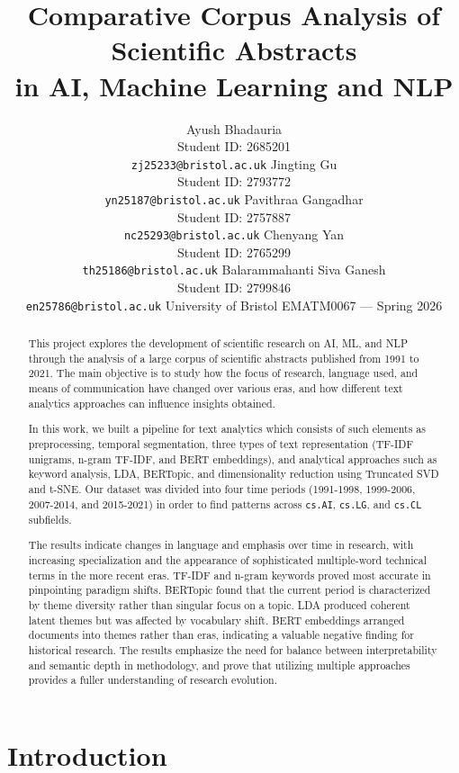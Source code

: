 \documentclass{article}
\title{Comparative Corpus Analysis of Scientific Abstracts\\
       in AI, Machine Learning and NLP}
\author{
  Ayush Bhadauria \\
  Student ID: 2685201 \\
  \texttt{zj25233@bristol.ac.uk}
  \And
  Jingting Gu \\
  Student ID: 2793772 \\
  \texttt{yn25187@bristol.ac.uk}
  \And
  Pavithraa Gangadhar \\
  Student ID: 2757887 \\
  \texttt{nc25293@bristol.ac.uk}
  \AND
  Chenyang Yan \\
  Student ID: 2765299 \\
  \texttt{th25186@bristol.ac.uk}
  \And
  Balarammahanti Siva Ganesh \\
  Student ID: 2799846 \\
  \texttt{en25786@bristol.ac.uk}
  \AND
  University of Bristol \quad EMATM0067 --- Spring 2026
}
\begin{document}
\maketitle

\begin{abstract}
This project explores the development of scientific
research on AI, ML, and NLP through the analysis of
a large corpus of scientific abstracts published from
1991 to 2021. The main objective is to study how the
focus of research, language used, and means of communication
have changed over various eras, and how different text
analytics approaches can influence insights obtained.

In this work, we built a pipeline for text analytics
which consists of such elements as preprocessing, temporal
segmentation, three types of text representation (TF-IDF
unigrams, n-gram TF-IDF, and BERT embeddings), and analytical
approaches such as keyword analysis, LDA, BERTopic, and
dimensionality reduction using Truncated SVD and t-SNE.
Our dataset was divided into four time periods (1991-1998,
1999-2006, 2007-2014, and 2015-2021) in order to find
patterns across \texttt{cs.AI}, \texttt{cs.LG},
and \texttt{cs.CL} subfields.

The results indicate changes in language and emphasis
over time in research, with increasing specialization and
the appearance of sophisticated multiple-word technical
terms in the more recent eras. TF-IDF and n-gram keywords
proved most accurate in pinpointing paradigm shifts. BERTopic
found that the current period is characterized by
theme diversity rather than singular focus on a topic.
LDA produced coherent latent themes but was affected by
vocabulary shift. BERT embeddings arranged documents into
themes rather than eras, indicating a valuable negative
finding for historical research. The results emphasize the
need for balance between interpretability and semantic
depth in methodology, and prove that utilizing multiple
approaches provides a fuller understanding of research evolution.
\end{abstract}


\section{Introduction}
\end{document}

